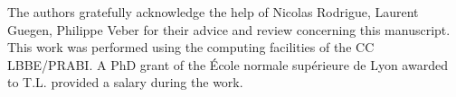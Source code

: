 The authors gratefully acknowledge the help of Nicolas Rodrigue, Laurent Guegen, Philippe Veber for their advice and review concerning this manuscript.
This work was performed using the computing facilities of the CC LBBE/PRABI.
A PhD grant of the École normale supérieure de Lyon awarded to T.L.
provided a salary during the work.
